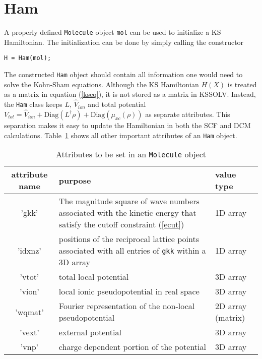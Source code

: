 \documentclass[11pt]{book}
\begin{document}
\section{Ham}
A properly defined {\tt Molecule} object {\tt mol} can be used to 
initialize a KS Hamiltonian.  The initialization can be done by simply 
calling the constructor
\begin{verbatim}
H = Ham(mol);
\end{verbatim}
The constructed {\tt Ham} object should contain all information
one would need to solve the Kohn-Sham equations. 
Although the KS Hamiltonian $H(X)$ is treated as a matrix in 
equation (\ref{kseq}), it is not stored as a matrix in KSSOLV. 
Instead, the {\tt Ham} class keeps $L$, $\hat{V}_{ion}$ and total 
potential $V_{tot} = \hat{V}_{ion} +\mbox{Diag}(L^{\dagger}\rho)+
\mbox{Diag}(\mu_{xc}(\rho))$ 
as separate attributes.  This separation makes it easy to update 
the Hamiltonian in both the SCF and DCM calculations.  Table~\ref{hamattr}
shows all other important attributes of an {\tt Ham} object.
%
\begin{table}[htbp]
\center
\begin{tabular}{|c|l|l|} \hline
attribute name &  purpose & value type  \\ \hline
'gkk'   & \begin{minipage}[t]{4in}
          The magnitude square of wave numbers associated with the
          kinetic energy that satisfy the cutoff constraint (\ref{ecut}) 
          \end{minipage}
        & 1D array \\
'idxnz' & \begin{minipage}[t]{4in}
          positions of the reciprocal lattice points associated with 
          all entries of {\tt gkk} within a 3D array 
          \end{minipage}
        & 1D array \\
'vtot'  & total local potential & 3D array \\
'vion' & local ionic pseudopotential in real space & 3D array \\
'wqmat'& Fourier representation of the non-local pseudopotential 
       & \begin{minipage}[t]{.6in} 2D array (matrix)\end{minipage} \\
'vext' & external potential & 3D array \\ 
'vnp'  & charge dependent portion of the potential & 3D array \\
\hline
\end{tabular}
\caption{Attributes to be set in an {\tt Molecule} object }
\label{hamattr}
\end{table}
\end{document}
